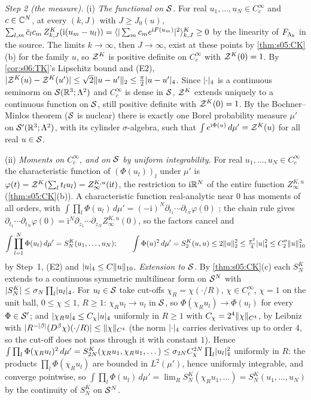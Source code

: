 \emph{Step 2 (the measure).} (i) \emph{The functional on $\mathcal S$.} For real $u_1,\dots,u_N\in C^\infty_c$ and $c\in\mathbb C^N$, at every $(k,J)$ with $J\ge J_0(u)$, $\sum_{l,m}\bar c_lc_m\,Z^K_{k,J}(\mathrm i(u_m-u_l))=\langle |\sum_mc_me^{\mathrm iF(u_m)}|^2\rangle^{K}_{k,J}\ge0$ by the linearity of $F_{\Lambda_k}$ in the source. The limits $k\to\infty$, then $J\to\infty$, exist at these points by \cref{thm:s05:CK}(b) for the family $u$, so $\mathcal Z^K$ is positive definite on $C^\infty_c$ with $\mathcal Z^K(0)=1$. By \cref{cor:s06:TK}'s Lipschitz bound and (E2), $|\mathcal Z^K(u)-\mathcal Z^K(u')|\le\sqrt2\lVert u-u'\rVert_2\le\frac\pi2\lvert u-u'\rvert_{4}$. Since $\lvert \cdot\rvert_{4}$ is a continuous seminorm on $\mathcal S(\mathbb R^3;\Lambda^2)$ and $C^\infty_c$ is dense in $\mathcal S$, $\mathcal Z^K$ extends uniquely to a continuous function on $\mathcal S$, still positive definite with $\mathcal Z^K(0)=1$. By the Bochner--Minlos theorem \cite{GJ,Jan97} ($\mathcal S$ is nuclear) there is exactly one Borel probability measure $\mu'$ on $\mathcal S'(\mathbb R^3;\Lambda^2)$, with its cylinder $\sigma$-algebra, such that $\int e^{\mathrm i\Phi(u)}\,d\mu'=\mathcal Z^K(u)$ for all real $u\in\mathcal S$.

(ii) \emph{Moments on $C^\infty_c$, and on $\mathcal S$ by uniform integrability.} For real $u_1,\dots,u_N\in C^\infty_c$ the characteristic function of $(\Phi(u_l))_l$ under $\mu'$ is $\varphi(t)=\mathcal Z^K(\sum_lt_lu_l)=Z^{K,u}_\infty(\mathrm it)$, the restriction to $\mathrm i\mathbb R^N$ of the entire function $Z^{K,u}_\infty$ (\cref{thm:s05:CK}(b)). A characteristic function real-analytic near $0$ has moments of all orders, with $\int\prod_l\Phi(u_l)\,d\mu'=(-\mathrm i)^N\partial_{t_1}\cdots\partial_{t_N}\varphi(0)$ \cite{Luk70}; the chain rule gives $\partial_{t_1}\cdots\partial_{t_N}\varphi(0)=\mathrm i^N\partial_{z_1}\cdots\partial_{z_N}Z^{K,u}_\infty(0)$, so the factors cancel and
\begin{equation}\label{eq:s09:moments}
\int\prod_{l=1}^N\Phi(u_l)\,d\mu'=S^K_N(u_1,\dots,u_N);\qquad\int\Phi(u)^2\,d\mu'=S^K_2(u,u)\le2\lVert u\rVert_2^2\le\tfrac{\pi^2}4\lvert u\rvert_{4}^2\le C_2''\lVert u\rVert_{10}^2
\end{equation}
by Step~1, (E2) and $\lvert u\rvert_{4}\le C\lVert u\rVert_{10}$. \emph{Extension to $\mathcal S$.} By \cref{thm:s05:CK}(c) each $S^K_N$ extends to a continuous symmetric multilinear form on $\mathcal S^N$ with $|S^K_N|\le\sigma_N\prod_l\lvert u_l\rvert_{4}$. For $u_l\in\mathcal S$ take cut-offs $\chi_R=\chi(\cdot/R)$, $\chi\in C^\infty_c$, $\chi=1$ on the unit ball, $0\le\chi\le1$, $R\ge1$: $\chi_Ru_l\to u_l$ in $\mathcal S$, so $\Phi(\chi_Ru_l)\to\Phi(u_l)$ for every $\Phi\in\mathcal S'$; and $\lvert \chi_Ru\rvert_{4}\le C_\chi\lvert u\rvert_{4}$ uniformly in $R\ge1$ with $C_\chi=2^4\lVert \chi\rVert_{C^4}$, by Leibniz with $|R^{-|\beta|}(D^\beta\chi)(\cdot/R)|\le\lVert \chi\rVert_{C^4}$ (the norm $\lvert \cdot\rvert_{4}$ carries derivatives up to order $4$, so the cut-off does not pass through it with constant $1$). Hence $\int\prod_l\Phi(\chi_Ru_l)^2\,d\mu'=S^K_{2N}(\chi_Ru_1,\chi_Ru_1,\dots)\le\sigma_{2N}C_\chi^{2N}\prod_l\lvert u_l\rvert_{4}^2$ uniformly in $R$: the products $\prod_l\Phi(\chi_Ru_l)$ are bounded in $L^2(\mu')$, hence uniformly integrable, and converge pointwise, so $\int\prod_l\Phi(u_l)\,d\mu'=\lim_RS^K_N(\chi_Ru_1,\dots)=S^K_N(u_1,\dots,u_N)$ by the continuity of $S^K_N$ on $\mathcal S^N$.

